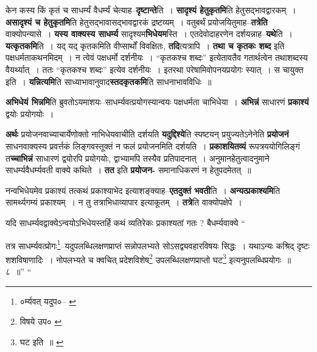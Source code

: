\documentclass[article,12pt,a4paper]{memoir}
\begin{document}
	  \endgroup
	

	  \pstart केन कस्य किं कृतं च साधर्म्यं वैधर्म्यं चेत्याह--\textbf{दृष्टान्ते}ति । \textbf{सादृश्यं हेतुकृतमि}ति हेतुसद्भावद्वारकम् । \textbf{असादृश्यं च हेतुकृतमि}ति हेतुसद्भावासद्भावद्वारकं द्रष्टव्यम् । वतुबर्थं प्रयोजयितुमाह--\textbf{तत्रेति} वाक्योपन्यासे । \textbf{यस्य वाक्यस्य साधर्म्य} सादृश्यम\textbf{भिधेयम}स्ति । एतदेवोदाहरणेन दर्शयन्नाह--\textbf{यथे}ति । \textbf{यत्कृतकमि}ति । यद् यद् कृतकमिति वीप्सार्थों विवक्षितः, \textbf{तदि}त्यत्रापि । \textbf{तथा च कृतकः शब्द} इति पक्षधर्मताकथनमिदम् । न त्वेवं पक्षधर्मो दर्शनीयः । “कृतकश्च शब्दः” इत्येतावतैव गतार्थत्वेन तथाशब्दस्य वैयर्थ्यात् । ततः “कृतकश्च शब्दः” इत्येव दर्शनीयः । इतरथा परेषामिवोपनयप्रयोगः स्यात् । स चायुक्त इति । \textbf{यन्नित्यमि}ति साध्याभावानुवाद\textbf{स्तदकृतकमि}ति साधनाभावविधिः ॥
	\pend
      

	  \pstart \textbf{अभिधेयं भिन्नमि}ति ब्रुवतोऽयमाशयः--साधर्म्यवत्प्रयोगस्यान्वयः पक्षधर्मता चाभिधेया । \textbf{अभिन्नं} साधारणं \textbf{प्रकाश्यं} द्वयोः प्रयोगयोः ।
	\pend
      

	  \pstart \textbf{अर्थः} प्रयोजनवाच्याचार्येणोक्तो नाभिधेयवाचीति दर्शयति \textbf{यदुद्दिश्ये}ति स्पष्टयन् प्रयुज्यतेऽनेनेति \textbf{प्रयोजनं} साधनवाक्यस्य प्रवर्त्तकं लिङ्गवस्तूक्तं न फलं प्रयोजनमिति दर्शयति । \textbf{प्रकाशयितव्यं} रूपत्रययोगिलिङ्गं त\textbf{च्चाभिन्नं} साधारणं द्वयोरपि प्रयोगयोः, द्वाभ्यामपि तस्यैव प्रतिपादनात् । अनुमानहेतुत्वादनुमाने साधर्म्यवैधर्म्यवती वाक्ये कथिते । \textbf{तत} इति \textbf{प्रयोजन-} समानाधिकरणं न हेतुपदमेतत् ॥
	\pend
      

	  \pstart नन्वभिधेयमेव प्रकाश्यं तत्कथं प्रकाश्याभेद इत्याशङ्क्याह--\textbf{एतदुक्तं भवती}ति । \textbf{अन्यत्प्रकाश्यमि}ति सामर्थ्यगम्यं प्रकाश्यम् । न तु तत्राभिधाव्यापार इत्याकूतम् । \textbf{तत्रे}ति वाक्योपक्षेपे ।
	\pend
      

	  \pstart यदि साधर्म्यवद्वाक्येऽन्वयोऽभिधेयस्तर्हि कथं व्यतिरेकः प्रकाश्यतां गतः ? बैधर्म्यवाक्ये  \leavevmode{} “
	  
	तत्र साधर्म्यवत्प्रोगः\footnote{०र्म्यवत् यदुप०--\cite{dp-msD} \cite{dp-msB} \cite{dp-edP} \cite{dp-edH} \cite{dp-edE} \cite{dp-edN}}--यदुपलब्धिलक्षणप्राप्तं सन्नोपलभ्यते सोऽसद्व्यवहारविषयः सिद्धः । यथाऽन्यः कश्रिद् दृष्टः शशविषाणादिः । नोपलभ्यते च क्वचित् प्रदेशविशेष\footnote{विषये उप० \cite{dp-msC}} उपलब्धिलक्षणप्राप्तो घट\footnote{घट इति ॥ \cite{dp-msD} \cite{dp-msB} \cite{dp-edP} \cite{dp-edH} \cite{dp-edE} \cite{dp-edN}} इत्यनुपलब्धिप्रयोगः ॥ ८ ॥” “
	  
\end{document}
